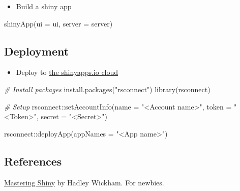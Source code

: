 \documentclass[
]{book}
\newenvironment{Shaded}{\begin{snugshade}}{\end{snugshade}}
\newcommand{\AttributeTok}[1]{\textcolor[rgb]{0.77,0.63,0.00}{#1}}
\newcommand{\CommentTok}[1]{\textcolor[rgb]{0.56,0.35,0.01}{\textit{#1}}}
\newcommand{\FunctionTok}[1]{\textcolor[rgb]{0.00,0.00,0.00}{#1}}
\newcommand{\NormalTok}[1]{#1}
\newcommand{\SpecialCharTok}[1]{\textcolor[rgb]{0.00,0.00,0.00}{#1}}
\newcommand{\StringTok}[1]{\textcolor[rgb]{0.31,0.60,0.02}{#1}}
\providecommand{\tightlist}{%
  \setlength{\itemsep}{0pt}\setlength{\parskip}{0pt}}
\begin{document}
\begin{itemize}
\tightlist
\item
  Build a shiny app
\end{itemize}

\begin{Shaded}
\begin{Highlighting}[]
\FunctionTok{shinyApp}\NormalTok{(}\AttributeTok{ui =}\NormalTok{ ui, }\AttributeTok{server =}\NormalTok{ server)}
\end{Highlighting}
\end{Shaded}

\hypertarget{deployment}{%
\subsection{Deployment}\label{deployment}}

\begin{itemize}
\tightlist
\item
  Deploy to \href{https://www.shinyapps.io/?_ga=2.5503866.871102833.1602978469-100003412.1602392815}{the shinyapps.io cloud}
\end{itemize}

\begin{Shaded}
\begin{Highlighting}[]
\CommentTok{\# Install packages }
\FunctionTok{install.packages}\NormalTok{(}\StringTok{"rsconnect"}\NormalTok{)}
\FunctionTok{library}\NormalTok{(rsconnect)}

\CommentTok{\# Setup }
\NormalTok{rsconnect}\SpecialCharTok{::}\FunctionTok{setAccountInfo}\NormalTok{(}\AttributeTok{name =} \StringTok{"\textless{}Account name\textgreater{}"}\NormalTok{, }
                          \AttributeTok{token =} \StringTok{"\textless{}Token\textgreater{}"}\NormalTok{,}
                          \AttributeTok{secret =} \StringTok{"\textless{}Secret\textgreater{}"}\NormalTok{)}

\NormalTok{rsconnect}\SpecialCharTok{::}\FunctionTok{deployApp}\NormalTok{(}\AttributeTok{appNames =} \StringTok{"\textless{}App name\textgreater{}"}\NormalTok{)}
\end{Highlighting}
\end{Shaded}

\hypertarget{references-4}{%
\subsection{References}\label{references-4}}

\href{https://mastering-shiny.org/}{Mastering Shiny} by Hadley Wickham. For newbies.
\end{document}
